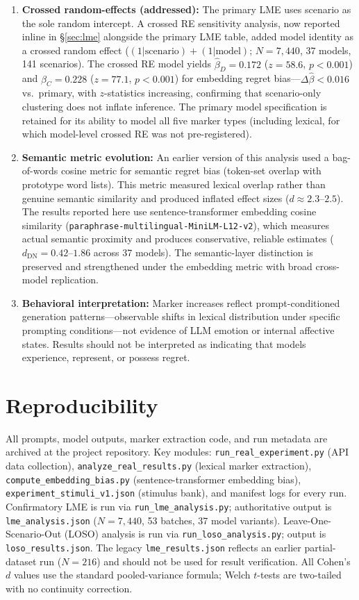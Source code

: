 \documentclass[11pt]{article}
\begin{document}
\begin{enumerate}
  \item \textbf{Crossed random-effects (addressed):} The primary LME uses scenario as the sole random intercept. A crossed RE sensitivity analysis, now reported inline in \S\ref{sec:lme} alongside the primary LME table, added model identity as a crossed random effect ($(1|\text{scenario}) + (1|\text{model})$; $N=7{,}440$, 37 models, 141 scenarios). The crossed RE model yields $\hat{\beta}_D=0.172$ ($z=58.6$, $p<0.001$) and $\hat{\beta}_C=0.228$ ($z=77.1$, $p<0.001$) for embedding regret bias---$\Delta\hat{\beta} < 0.016$ vs.\ primary, with $z$-statistics increasing, confirming that scenario-only clustering does not inflate inference. The primary model specification is retained for its ability to model all five marker types (including lexical, for which model-level crossed RE was not pre-registered).
  \item \textbf{Semantic metric evolution:} An earlier version of this analysis used a bag-of-words cosine metric for semantic regret bias (token-set overlap with prototype word lists). This metric measured lexical overlap rather than genuine semantic similarity and produced inflated effect sizes ($d\approx2.3$--$2.5$). The results reported here use sentence-transformer embedding cosine similarity (\texttt{paraphrase-multilingual-MiniLM-L12-v2}), which measures actual semantic proximity and produces conservative, reliable estimates ($d_\text{DN}=0.42$--$1.86$ across 37 models). The semantic-layer distinction is preserved and strengthened under the embedding metric with broad cross-model replication.
  \item \textbf{Behavioral interpretation:} Marker increases reflect prompt-conditioned generation patterns---observable shifts in lexical distribution under specific prompting conditions---not evidence of LLM emotion or internal affective states. Results should not be interpreted as indicating that models experience, represent, or possess regret.
\end{enumerate}

\section{Reproducibility}
All prompts, model outputs, marker extraction code, and run metadata are archived at the project repository.
Key modules: \texttt{run\_real\_experiment.py} (API data collection), \texttt{analyze\_real\_results.py} (lexical marker extraction), \texttt{compute\_embedding\_bias.py} (sentence-transformer embedding bias), \texttt{experiment\_stimuli\_v1.json} (stimulus bank), and manifest logs for every run.
Confirmatory LME is run via \texttt{run\_lme\_analysis.py}; authoritative output is \texttt{lme\_analysis.json} ($N=7{,}440$, 53 batches, 37 model variants). Leave-One-Scenario-Out (LOSO) analysis is run via \texttt{run\_loso\_analysis.py}; output is \texttt{loso\_results.json}.
The legacy \texttt{lme\_results.json} reflects an earlier partial-dataset run ($N=216$) and should not be used for result verification.
All Cohen's $d$ values use the standard pooled-variance formula; Welch $t$-tests are two-tailed with no continuity correction.
\end{document}

